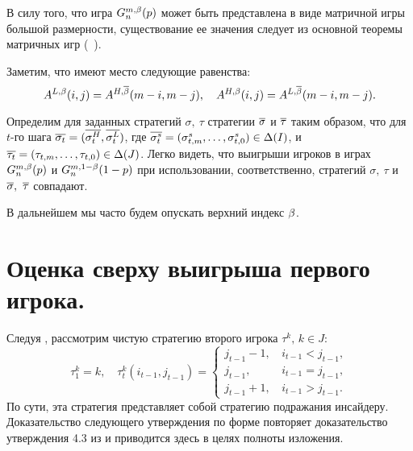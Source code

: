 {\begin{remark}
  В силу того, что игра $G^{m,\beta}_n(p)$ может быть представлена в виде матричной игры большой размерности, существование ее значения следует из основной теоремы матричных игр (\seename~\cite{morozov08}).
\end{remark}

Заметим, что имеют место следующие равенства:
\begin{equation*}
  A^{L,\beta}(i, j) = A^{H,{\overline{\beta}}}(m-i, m-j), \quad
  A^{H,\beta}(i, j) = A^{L,{\overline{\beta}}}(m-i, m-j).
\end{equation*}

\begin{remark}
  \label{ch1:rem:symm-payoffs}
  Определим для заданных стратегий $\sigma,\ \tau$ стратегии $\overline{\sigma}$ и $\overline{\tau}$ таким образом, что для $t$-го шага
  $\overline{\sigma_t} = (\overline{\sigma^H_t}, \overline{\sigma^L_t})$, где
  $\overline{\sigma^s_t}=(\sigma^s_{t,m},\ldots,\sigma^s_{t,0}) \in \Delta(I)$, и
  $\overline{\tau_t} = (\tau_{t,m},\ldots,\tau_{t,0}) \in \Delta(J)$.
  Легко видеть, что выигрыши игроков в играх $G^{m, \beta}_n(p)$ и $G^{m, 1-\beta}_n(1-p)$ при использовании, соответственно, стратегий $\sigma,\ \tau$ и $\overline{\sigma},\ \overline{\tau}$ совпадают.
\end{remark}

В дальнейшем мы часто будем опускать верхний индекс $\beta$.

\section{Оценка сверху выигрыша первого игрока.}\label{ch1:upper-bound}
Следуя \cite{domansky07}, рассмотрим чистую стратегию второго игрока $\tau^k, \, k \in J$:
\[
  \tau^k_1 = k, \quad \tau^k_t(i_{t-1}, j_{t-1}) = \begin{cases}
    j_{t-1} - 1, & \, i_{t-1} < j_{t-1}, \\
    j_{t-1},     & \, i_{t-1} = j_{t-1}, \\
    j_{t-1} + 1, & \, i_{t-1} > j_{t-1}.
  \end{cases}
\]
По сути, эта стратегия представляет собой стратегию подражания инсайдеру.
Доказательство следующего утверждения по форме повторяет доказательство утверждения 4.3 из \cite{domansky07} и приводится здесь в целях полноты изложения.

}

